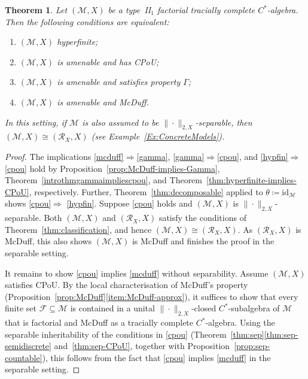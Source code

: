 \documentclass[a4paper,11pt]{amsart}
\newtheorem{theorem}{Theorem}
\theoremstyle{definition}
\numberwithin{equation}{section}
\numberwithin{theorem}{section}
\newcommand{\M}{\mathcal{M}}
\begin{document}
\begin{theorem}\label{thm:hyperfinite}
	Let $(\mathcal M, X)$ be a type~{\rm II}$_1$ factorial tracially complete $C^*$-algebra. Then the following conditions are equivalent:
	\begin{enumerate}
		\item\label{hypfin} $(\mathcal M, X)$ hyperfinite;
		\item\label{cpou}$(\mathcal M, X)$ is {}amenable and has CPoU;
		\item\label{gamma} $(\mathcal M, X)$ is {}amenable and satisfies property $\Gamma$;
		\item\label{mcduff} $(\mathcal M, X)$ is {}amenable and McDuff.
	\end{enumerate}
	In this setting, if $\M$ is also assumed to be $\|\cdot\|_{2, X}$-separable, then $(\M, X) \cong (\mathcal R_X, X)$ (see Example~\ref{Ex:ConcreteModels}).
\end{theorem}

\begin{proof}
	The implications \ref{mcduff}$\Rightarrow$\ref{gamma}, \ref{gamma}$\Rightarrow$\ref{cpou}, and \ref{hypfin}$\Rightarrow$\ref{cpou} hold by Proposition~\ref{prop:McDuff-implies-Gamma}, Theorem~\ref{introthmgammaimpliescpou}, and Theorem~\ref{thm:hyperfinite-implies-CPoU}, respectively.  Further, Theorem~\ref{thm:decomposable} applied to $\theta \coloneqq \mathrm{id}_\mathcal M$ shows \ref{cpou}$\Rightarrow$ \ref{hypfin}.  Suppose \ref{cpou} holds and $(\mathcal M, X)$ is $\|\cdot\|_{2,   X}$-separable. Both $(\mathcal M, X)$ and $(\mathcal R_X, X)$ satisfy the conditions of Theorem~\ref{thm:classification}, and hence $(\mathcal M, X) \cong (\mathcal R_X, X)$.  As $(\mathcal R_X, X)$ is McDuff, this also shows $(\mathcal M, X)$ is McDuff and finishes the proof in the separable setting.
	
	It remains to show \ref{cpou} implies \ref{mcduff} without separability.  Assume $(\mathcal M, X)$ satisfies CPoU.  By the local characterisation of McDuff's property (Proposition~\ref{prop:McDuff}\ref{item:McDuff-approx}), it suffices to show that every finite set $\mathcal F \subseteq \mathcal M$ is contained in a unital $\|\cdot\|_{2, X}$-closed $C^*$-subalgebra of $\mathcal M$ that is factorial and McDuff as a tracially complete $C^*$-algebra.  Using the separable inheritability of the conditions in \ref{cpou} (Theorem~\ref{thm:sep}\ref{thm:sep-semidiscrete} and~\ref{thm:sep-CPoU}, together with Proposition~\ref{prop:sep-countable}), this follows from the fact that \ref{cpou} implies \ref{mcduff} in the separable setting.
\end{proof}
\end{document}
